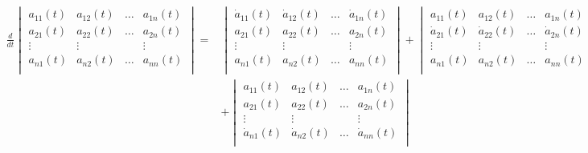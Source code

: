 \documentclass[]{article}
\begin{document}
\begin{align*}
    \frac{d}{dt} \begin{vmatrix}
                     a_{11}(t) & a_{12}(t) & \dots & a_{1n}(t) \\
                     a_{21}(t) & a_{22}(t) & \dots & a_{2n}(t) \\
                     \vdots    & \vdots    &       & \vdots    \\
                     a_{n1}(t) & a_{n2}(t) & \dots & a_{nn}(t) \\
                 \end{vmatrix}
    = &
    \begin{vmatrix}
        \dot{a}_{11}(t) & \dot{a}_{12}(t) & \dots & \dot{a}_{1n}(t) \\
        a_{21}(t)       & a_{22}(t)       & \dots & a_{2n}(t)       \\
        \vdots          & \vdots          &       & \vdots          \\
        a_{n1}(t)       & a_{n2}(t)       & \dots & a_{nn}(t)       \\
    \end{vmatrix}
    +
    \begin{vmatrix}
        a_{11}(t)       & a_{12}(t)       & \dots & a_{1n}(t)       \\
        \dot{a}_{21}(t) & \dot{a}_{22}(t) & \dots & \dot{a}_{2n}(t) \\
        \vdots          & \vdots          &       & \vdots          \\
        a_{n1}(t)       & a_{n2}(t)       & \dots & a_{nn}(t)       \\
    \end{vmatrix}
    +
    \dots
    \\
      & +
    \begin{vmatrix}
        a_{11}(t)       & a_{12}(t)       & \dots & a_{1n}(t)       \\
        a_{21}(t)       & a_{22}(t)       & \dots & a_{2n}(t)       \\
        \vdots          & \vdots          &       & \vdots          \\
        \dot{a}_{n1}(t) & \dot{a}_{n2}(t) & \dots & \dot{a}_{nn}(t) \\
    \end{vmatrix}
\end{align*}
\end{document}
